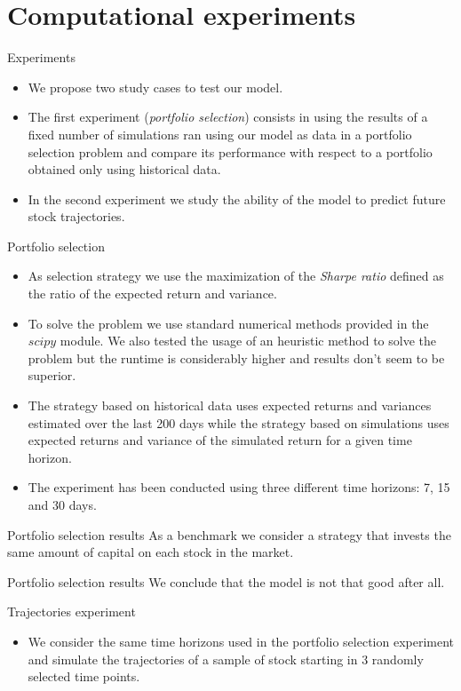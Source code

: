 \documentclass{beamer}
\begin{document}
	\section{Computational experiments}
		\begin{frame}{Experiments}
		\begin{itemize}
			\item We propose two study cases to test our model. 
			\item The first experiment (\textit{portfolio selection}) consists in using the results of a fixed number of simulations ran using our model as data in a portfolio selection 
				  problem and compare its performance with respect to a portfolio obtained only using historical data.
	    	\item In the second experiment we study the ability of the model to predict future stock trajectories.
		\end{itemize}	
		\end{frame}

		\begin{frame}{Portfolio selection}
		\begin{itemize}
			\item As selection strategy we use the maximization of the \textit{Sharpe ratio} defined as the ratio of the expected return and variance.
			\item To solve the problem we use standard numerical methods provided in the $scipy$ module. We also tested the usage of an heuristic method to solve the problem but the runtime is
		          considerably higher and results don't seem to be superior.
			\item The strategy based on historical data uses expected returns and variances estimated over the last 200 days while the strategy based on simulations uses expected returns and
			  	  variance of the simulated return for a given time horizon.
			\item The experiment has been conducted using three different time horizons: 7, 15 and 30 days.
		\end{itemize}
		\end{frame}
	
		\begin{frame}{Portfolio selection results}
			As a benchmark we consider a strategy that invests the same amount of capital on each stock in the market.
		
		\end{frame}
	
		\begin{frame}{Portfolio selection results}
			We conclude that the model is not that good after all.
		\end{frame}
	
		\begin{frame}{Trajectories experiment}
		\begin{itemize}
			\item We consider the same time horizons used in the portfolio selection experiment and simulate the trajectories of a sample of stock starting in 3 randomly selected time points.
			
		\end{itemize}
			
		\end{frame}
	
\end{document}

